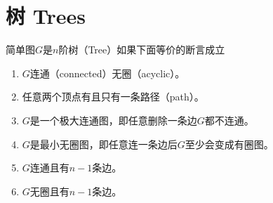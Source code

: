 \section{树 Trees}
\begin{theorem}
	简单图$G$是$n$阶树（Tree）如果下面等价的断言成立
	\begin{enumerate}
		\item $G$连通（connected）无圈（acyclic）。
		\item 任意两个顶点有且只有一条路径（path）。
		\item $G$是一个极大连通图，即任意删除一条边$G$都不连通。
		\item $G$是最小无圈图，即任意连一条边后$G$至少会变成有圈图。
		\item $G$连通且有$n-1$条边。
		\item $G$无圈且有$n-1$条边。
	\end{enumerate}
\end{theorem}